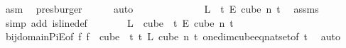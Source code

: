 \begin{isabellebody}
\ asm\ \isamarkupfalse%
\ presburger\isanewline
\ \ \ \ \isamarkupfalse%
\ {\isacharparenleft}{\kern0pt}auto{\isacharparenright}{\kern0pt}\isanewline
\ \ \isacommand{{\isacharbraceright}{\kern0pt}}\isamarkupfalse%
\isanewline
\isanewline
\ \ \isamarkupfalse%
\isanewline
\ \ \isacommand{{\isacharbraceleft}{\kern0pt}}\isamarkupfalse%
\isanewline
\ \ \ \ \isamarkupfalse%
\ {\isachardoublequoteopen}L\ {\isasymin}\ {\isacharbraceleft}{\kern0pt}{\isachardot}{\kern0pt}{\isachardot}{\kern0pt}{\isacharless}{\kern0pt}t{\isacharbraceright}{\kern0pt}\ {\isasymrightarrow}\isactrlsub E\ {\isacharparenleft}{\kern0pt}cube\ n\ t{\isacharparenright}{\kern0pt}{\isachardoublequoteclose}\ \isamarkupfalse%
\ assms{\isacharparenleft}{\kern0pt}{}{\isacharparenright}{\kern0pt}\ \isamarkupfalse%
\ {\isacharparenleft}{\kern0pt}simp\ add{\isacharcolon}{\kern0pt}\ is{\isacharunderscore}{\kern0pt}line{\isacharunderscore}{\kern0pt}def{\isacharparenright}{\kern0pt}\isanewline
\ \ \ \ \isamarkupfalse%
\ \isamarkupfalse%
\ {\isachardoublequoteopen}{\isacharquery}{\kern0pt}L\ {\isasymin}\ {\isacharparenleft}{\kern0pt}cube\ {}\ t{\isacharparenright}{\kern0pt}\ {\isasymrightarrow}\isactrlsub E\ {\isacharparenleft}{\kern0pt}cube\ n\ t{\isacharparenright}{\kern0pt}{\isachardoublequoteclose}\isanewline
\ \ \ \ \ \ \isamarkupfalse%
\ bij{\isacharunderscore}{\kern0pt}domain{\isacharunderscore}{\kern0pt}PiE{\isacharbrackleft}{\kern0pt}of\ {\isachardoublequoteopen}{\isacharparenleft}{\kern0pt}{\isasymlambda}f{\isachardot}{\kern0pt}\ f\ {}{\isacharparenright}{\kern0pt}{\isachardoublequoteclose}\ {\isachardoublequoteopen}{\isacharparenleft}{\kern0pt}cube\ {}\ t{\isacharparenright}{\kern0pt}{\isachardoublequoteclose}\ {\isachardoublequoteopen}{\isacharbraceleft}{\kern0pt}{\isachardot}{\kern0pt}{\isachardot}{\kern0pt}{\isacharless}{\kern0pt}t{\isacharbraceright}{\kern0pt}{\isachardoublequoteclose}\ {\isachardoublequoteopen}L{\isachardoublequoteclose}\ {\isachardoublequoteopen}cube\ n\ t{\isachardoublequoteclose}{\isacharbrackright}{\kern0pt}\ one{\isacharunderscore}{\kern0pt}dim{\isacharunderscore}{\kern0pt}cube{\isacharunderscore}{\kern0pt}eq{\isacharunderscore}{\kern0pt}nat{\isacharunderscore}{\kern0pt}set{\isacharbrackleft}{\kern0pt}of\ {\isachardoublequoteopen}t{\isachardoublequoteclose}{\isacharbrackright}{\kern0pt}\ \isamarkupfalse%
\ auto\isanewline
\ \ \isacommand{{\isacharbraceright}{\kern0pt}}\isamarkupfalse%

\end{isabellebody}
